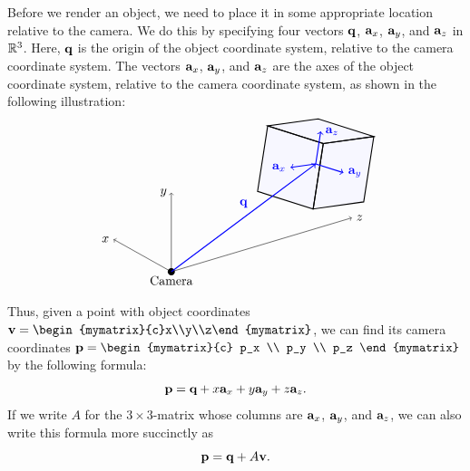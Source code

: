 Before we render an object, we need to place it in some appropriate
location relative to the camera. We do this by specifying four vectors
$\mbox{\bf q}$, $\mbox{\bf a}_x$, $\mbox{\bf a}_y$, and $\mbox{\bf a}_z$ in
$\mathbb{R}^3$. Here, $\mbox{\bf q}$ is the origin of the object coordinate
system, relative to the camera coordinate system. The vectors
$\mbox{\bf a}_x$, $\mbox{\bf a}_y$, and $\mbox{\bf a}_z$ are the axes of the
object coordinate system, relative to the camera coordinate system, as
shown in the following illustration:
\begin{equation*}
  \begin{tikzpicture}
    \fill (0,0) circle (0.1) node[below] {Camera};
    \begin{scope}[x={(-0.8cm,0.45cm)},z={(1cm,0.3cm)},y={(0cm,1.1cm)}]
      \draw[->] (0,0,0) -- (2,0,0) node[left]{$x$};
      \draw[->] (0,0,0) -- (0,2,0) node[left]{$y$};
      \draw[->] (0,0,0) -- (0,0,5) node[right]{$z$};
    \end{scope}
    \begin{scope}[shift={(4,3)}]
      \begin{scope}[x={(-1cm,-0.14cm)},y={(1.1cm,-0.35cm)},z={(0.2cm,1.3cm)},scale=0.7]
        \begin{scope}
          \clip (1,-1,1) -- (1,-1,-1) -- (1,1,-1) -- (-1,1,-1)
          -- (-1,1,1) -- (-1,-1,1) -- cycle;
          \fill[blue!3] (1,-1,1) -- (1,-1,-1) -- (1,1,-1) -- (-1,1,-1)
          -- (-1,1,1) -- (-1,-1,1) -- cycle;
        \end{scope}
        \draw[thick] ( 1, 1, 1) -- ( 1, 1,-1) -- ( 1,-1,-1) -- ( 1,-1, 1) -- cycle;
        \draw[thick] ( 1, 1, 1) -- (-1, 1, 1) -- (-1, 1,-1) -- ( 1, 1,-1) -- cycle;
        \draw[thick] ( 1, 1, 1) -- ( 1,-1, 1) -- (-1,-1, 1) -- (-1, 1, 1) -- cycle;
        \draw[thick,blue,->] (0,0,0) -- (1,0,0) node[left]{$\vect{a}_x$};
        \draw[thick,blue,->] (0,0,0) -- (0,1,0) node[right]{$\vect{a}_y$};
        \draw[thick,blue,->] (0,0,0) -- (0,0,1) node[right]{$\vect{a}_z$};
      \end{scope}
    \end{scope}
    \draw[thick,blue,->] (0,0) -- node[above=1ex]{$\vect{q}$}(4,3);
  \end{tikzpicture}
\end{equation*}
Thus, given a point with object coordinates
$\vect{v}=\begin{mymatrix}{c}x\\y\\z\end{mymatrix}$, we can find its
camera coordinates
$\vect{p} = \begin{mymatrix}{c} p_x \\ p_y \\ p_z \end{mymatrix}$ by
the following formula:
\begin{equation*}
  \mbox{\bf p} = \mbox{\bf q} + x\mbox{\bf a}_x + y\mbox{\bf a}_y + z\mbox{\bf a}_z.
\end{equation*}
If we write $A$ for the $3\times 3$-matrix whose columns are $\mbox{\bf a}_x$,
$\mbox{\bf a}_y$, and $\mbox{\bf a}_z$, we can also write this formula more succinctly as
\begin{equation*}
  \mbox{\bf p} = \mbox{\bf q} + A\mbox{\bf v}.
\end{equation*}

